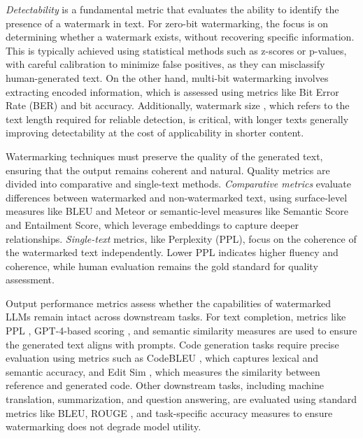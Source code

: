 \textit{Detectability} is a fundamental metric that evaluates the ability to identify the presence of a watermark in text. For zero-bit watermarking, the focus is on determining whether a watermark exists, without recovering specific information. This is typically achieved using statistical methods such as z-scores or p-values, with careful calibration to minimize false positives, as they can misclassify human-generated text. On the other hand, multi-bit watermarking involves extracting encoded information, which is assessed using metrics like Bit Error Rate (BER) \cite{yoo-etal-2023-robust} and bit accuracy\cite{yoo-etal-2024-advancing}. Additionally, watermark size \cite{perkins2023academic}, which refers to the text length required for reliable detection, is critical, with longer texts generally improving detectability at the cost of applicability in shorter content.

  
Watermarking techniques must preserve the quality of the generated text, ensuring that the output remains coherent and natural. Quality metrics are divided into comparative and single-text methods. \textit{Comparative metrics} evaluate differences between watermarked and non-watermarked text, using surface-level measures like BLEU \cite{10.3115/1073083.1073135} and Meteor \cite{alkawaz2016concise} or semantic-level measures like Semantic Score and Entailment Score, which leverage embeddings to capture deeper relationships. \textit{Single-text} metrics, like Perplexity (PPL), focus on the coherence of the watermarked text independently. Lower PPL indicates higher fluency and coherence, while human evaluation remains the gold standard for quality assessment.




Output performance metrics assess whether the capabilities of watermarked LLMs remain intact across downstream tasks. For text completion, metrics like PPL \cite{yoo-etal-2023-robust}, GPT-4-based scoring \cite{cryptoeprint:2023/1661}, and semantic similarity measures are used to ensure the generated text aligns with prompts. Code generation tasks require precise evaluation using metrics such as CodeBLEU \cite{guan-etal-2024-codeip}, which captures lexical and semantic accuracy, and Edit Sim \cite{tu-etal-2024-waterbench}, which measures the similarity between reference and generated code. Other downstream tasks, including machine translation, summarization, and question answering, are evaluated using standard metrics like BLEU, ROUGE \cite{lin2004rouge}, and task-specific accuracy measures to ensure watermarking does not degrade model utility.


